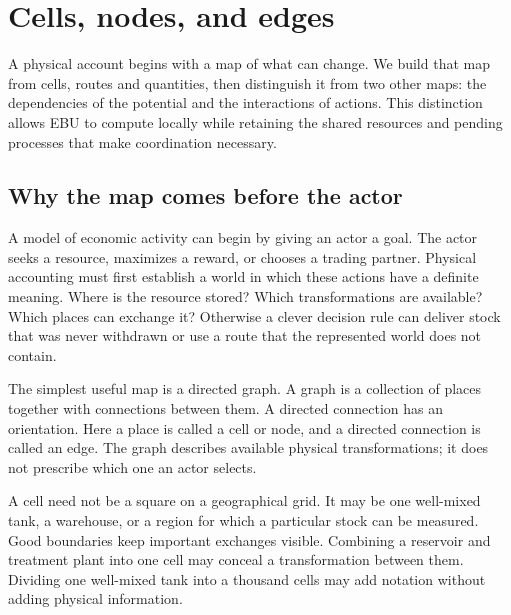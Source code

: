 \chapter{Cells, nodes, and edges}\label{ch:graph}

A physical account begins with a map of what can change. We build that map from cells, routes and quantities, then distinguish it from two other maps: the dependencies of the potential and the interactions of actions. This distinction allows EBU to compute locally while retaining the shared resources and pending processes that make coordination necessary.


\section{Why the map comes before the actor}
A model of economic activity can begin by giving an actor a goal. The actor seeks a resource, maximizes a reward, or chooses a trading partner. Physical accounting must first establish a world in which these actions have a definite meaning. Where is the resource stored? Which transformations are available? Which places can exchange it? Otherwise a clever decision rule can deliver stock that was never withdrawn or use a route that the represented world does not contain.

The simplest useful map is a directed graph. A graph is a collection of places together with connections between them. A directed connection has an orientation. Here a place is called a cell or node, and a directed connection is called an edge. The graph describes available physical transformations; it does not prescribe which one an actor selects.

A cell need not be a square on a geographical grid. It may be one well-mixed tank, a warehouse, or a region for which a particular stock can be measured. Good boundaries keep important exchanges visible. Combining a reservoir and treatment plant into one cell may conceal a transformation between them. Dividing one well-mixed tank into a thousand cells may add notation without adding physical information.

